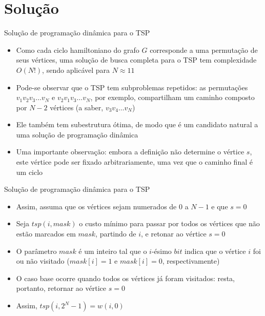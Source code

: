 \section{Solução}

\begin{frame}[fragile]{Solução de programação dinâmica para o TSP}

    \begin{itemize}
        \item Como cada ciclo hamiltoniano do grafo $G$ corresponde a uma permutação de seus
            vértices, uma solução de busca completa para o TSP tem complexidade $O(N!)$, sendo
            aplicável para $N\approx 11$

        \item Pode-se observar que o TSP tem subproblemas repetidos: as permutações 
            $v_1v_2v_3\ldots v_N$ e $v_2v_1v_3\ldots v_N$, por exemplo, compartilham um caminho
            composto por $N - 2$ vértices (a saber, $v_3v_4\ldots v_N$)

        \item Ele também tem subestrutura ótima, de modo que é um candidato natural a uma solução
            de programação dinâmica

        \item Uma importante observação: embora a definição não determine o vértice $s$, 
            este vértice pode ser fixado arbitrariamente, uma vez que o caminho final é um
            ciclo
    \end{itemize}

\end{frame}

\begin{frame}[fragile]{Solução de programação dinâmica para o TSP}

    \begin{itemize}
        \item Assim, assuma que os vértices sejam numerados de $0$ a $N - 1$ e que $s = 0$

        \item Seja $tsp(i, mask)$ o custo mínimo para passar por todos os vértices que não
            estão marcados em $mask$, partindo de $i$, e retonar ao vértice $s = 0$

        \item O parâmetro $mask$ é um inteiro tal que o $i$-ésimo $bit$ indica que o vértice $i$
            foi ou não visitado ($mask[i] = 1$ e $mask[i] = 0$, respectivamente)

        \item O caso base ocorre quando todos os vértices já foram visitados: resta, portanto,
            retornar ao vértice $s = 0$

        \item Assim, $tsp(i, 2^N - 1) = w(i, 0)$
    \end{itemize}

\end{frame}

